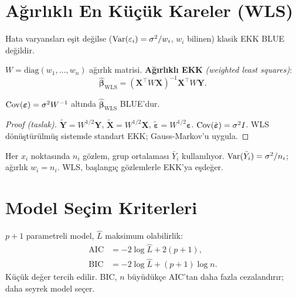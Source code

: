 \section{Ağırlıklı En Küçük Kareler (WLS)}
\label{sec:wls}

Hata varyansları eşit değilse ($\operatorname{Var}(\varepsilon_i)=\sigma^2/w_i$, $w_i$ bilinen) klasik EKK BLUE değildir.

\begin{tanim}\label{def:wls}
$W=\mathrm{diag}(w_1,\ldots,w_n)$ ağırlık matrisi. \textbf{Ağırlıklı EKK} \emph{(weighted least squares)}:
\[
  \hat{\boldsymbol\beta}_{\mathrm{WLS}} = (\mathbf{X}^\top W\mathbf{X})^{-1}\mathbf{X}^\top W\mathbf{Y}.
\]
\end{tanim}

\begin{teorem}\label{thm:wls_gm}
$\operatorname{Cov}(\boldsymbol\varepsilon)=\sigma^2 W^{-1}$ altında $\hat{\boldsymbol\beta}_{\mathrm{WLS}}$ BLUE'dur.
\end{teorem}

\begin{proof}[Proof (taslak)]
$\tilde{\mathbf{Y}}=W^{1/2}\mathbf{Y}$, $\tilde{\mathbf{X}}=W^{1/2}\mathbf{X}$, $\tilde{\boldsymbol\varepsilon}=W^{1/2}\boldsymbol\varepsilon$. $\operatorname{Cov}(\tilde{\boldsymbol\varepsilon})=\sigma^2 I$. WLS dönüştürülmüş sistemde standart EKK; Gauss-Markov'u uygula.
\end{proof}

\begin{ornek}\label{ex:wls_grup}
Her $x_i$ noktasında $n_i$ gözlem, grup ortalaması $\bar Y_i$ kullanılıyor. $\operatorname{Var}(\bar Y_i)=\sigma^2/n_i$; ağırlık $w_i=n_i$. WLS, başlangıç gözlemlerle EKK'ya eşdeğer.
\end{ornek}

\section{Model Seçim Kriterleri}
\label{sec:model_secim}

\begin{tanim}\label{def:aic_bic}
$p+1$ parametreli model, $\hat L$ maksimum olabilirlik:
\begin{align*}
\mathrm{AIC} &= -2\log\hat L + 2(p+1), \\
\mathrm{BIC} &= -2\log\hat L + (p+1)\log n.
\end{align*}
Küçük değer tercih edilir. BIC, $n$ büyüdükçe AIC'tan daha fazla cezalandırır; daha seyrek model seçer.
\end{tanim}

